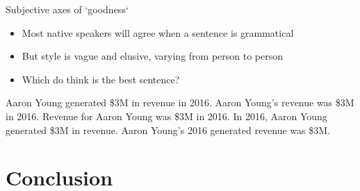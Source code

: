 \documentclass[10pt, compress]{beamer}
\begin{document}
\begin{frame}{Subjective axes of `goodness`}
    \begin{itemize}
        \item Most native speakers will agree when a sentence is grammatical
        \item But style is vague and elusive, varying from person to person   \pause
        \item Which do think is the best sentence?
    \end{itemize}
    
    \begin{exe}
        \ex Aaron Young generated \$3M in revenue in 2016.
        \ex Aaron Young's revenue was \$3M in 2016.
        \ex Revenue for Aaron Young was \$3M in 2016.
        \ex In 2016, Aaron Young generated \$3M in revenue.
        \ex Aaron Young's 2016 generated revenue was \$3M.
    \end{exe}
    
\end{frame}


\section{Conclusion}











\end{document}
